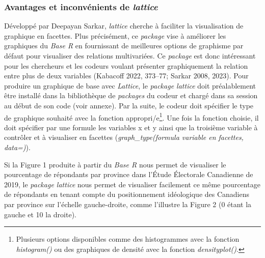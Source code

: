 \documentclass[
  letterpaper,
]{scrbook}
\begin{document}
\hypertarget{avantages-et-inconvuxe9nients-de-lattice}{%
\subsubsection{\texorpdfstring{Avantages et inconvénients de
\emph{lattice}}{Avantages et inconvénients de lattice}}\label{avantages-et-inconvuxe9nients-de-lattice}}

Développé par Deepayan Sarkar, \emph{lattice} cherche à faciliter la
visualisation de graphique en facettes. Plus précisément, ce
\emph{package} vise à améliorer les graphiques du \emph{Base R} en
fournissant de meilleures options de graphisme par défaut pour
visualiser des relations multivariées. Ce \emph{package} est donc
intéressant pour les chercheurs et les codeurs voulant présenter
graphiquement la relation entre plus de deux variables (Kabacoff 2022,
373--77; Sarkar 2008, 2023). Pour produire un graphique de base avec
\emph{Lattice}, le \emph{package lattice} doit préalablement être
installé dans la bibliothèque de \emph{packages} du codeur et chargé
dans sa session au début de son code (voir annexe). Par la suite, le
codeur doit spécifier le type de graphique souhaité avec la fonction
appropri/e\footnote{Plusieurs options disponibles comme des histogrammes
  avec la fonction \emph{histogram()} ou des graphiques de densité avec
  la fonction \emph{densityplot()}.}. Une fois la fonction choisie, il
doit spécifier par une formule les variables x et y ainsi que la
troisième variable à contrôler et à visualiser en facettes
(\emph{graph\_type(formula \textbar{} variable en facettes, data=)}).

Si la Figure 1 produite à partir du \emph{Base R} nous permet de
visualiser le pourcentage de répondants par province dans l'Étude
Électorale Canadienne de 2019, le \emph{package lattice} nous permet de
visualiser facilement ce même pourcentage de répondants en tenant compte
du positionnement idéologique des Canadiens par province sur l'échelle
gauche-droite, comme l'illustre la Figure 2 (0 étant la gauche et 10 la
droite).
\end{document}
